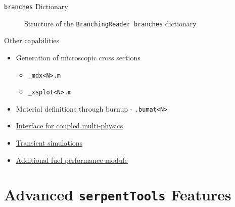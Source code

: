 \documentclass{beamer}
\newcommand{\st}{\texttt{serpentTools} }
\begin{document}
\begin{frame}{\texttt{branches} Dictionary}
    \begin{figure}
        \caption{Structure of the \texttt{BranchingReader branches} dictionary}
    \end{figure}
\end{frame}

\begin{frame}{Other capabilities}
    \begin{itemize}
        \item{Generation of microscopic cross sections}
        \begin{itemize}
            \item{\texttt{\_mdx<N>.m}}
            \item{\texttt{\_xsplot<N>.m}}
        \end{itemize}
        \item{Material definitions through burnup - \texttt{.bumat<N>}}
        \item{\href{http://serpent.vtt.fi/mediawiki/index.php/Coupled\_multi-physics\_calculations}{Interface for coupled multi-physics}}
        \item{\href{http://serpent.vtt.fi/mediawiki/index.php/Transient\_simulations}{Transient simulations}}
        \item{\href{http://serpent.vtt.fi/mediawiki/index.php/FINIX\_fuel\_behavior\_module}{Additional fuel performance module}}
    \end{itemize}
\end{frame}

\section{Advanced \st Features}
\end{document}
